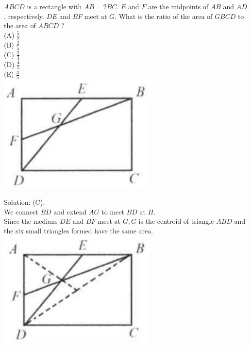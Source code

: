 \documentclass{article}
\begin{document}
\(A B C D\) is a rectangle with \(A B=2 B C\). \(E\) and \(F\) are the midpoints of \(A B\) and \(A D\), respectively. \(D E\) and \(B F\) meet at \(G\). What is the ratio of the area of \(G B C D\) to the area of \(A B C D\) ?\\
(A) \(\frac{5}{2}\)\\
(B) \(\frac{2}{5}\)\\
(C) \(\frac{2}{3}\)\\
(D) \(\frac{4}{5}\)\\
(E) \(\frac{3}{5}\)\\
\centering
\includegraphics[width=\textwidth]{images/011.jpg}

Solution: (C).\\
We connect \(B D\) and extend \(A G\) to meet \(B D\) at \(H\).\\
Since the medians \(D E\) and \(B F\) meet at \(G, G\) is the centroid of triangle \(A B D\) and the six small triangles formed have the same area.\\
\centering
\includegraphics[width=\textwidth]{images/011(1).jpg}
\end{document}
